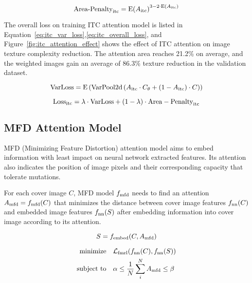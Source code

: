 \figureImageSmoothingComparison%

\begin{equation}
  \text{Area-Penalty}_{\text{itc}} = {\mathrm{E}(A_{\text{itc}})}^{3-2 \cdot \mathrm{E}(A_{\text{itc}})}
  \label{eq:itc_area_penalty}
\end{equation}

\figureItcAttentionEffect%

The overall loss on training ITC attention model is listed in Equation~\ref{eq:itc_var_loss},\ref{eq:itc_overall_loss}, and Figure~\ref{fig:itc_attention_effect} shows the effect of ITC attention on image texture complexity reduction. The attention area reaches 21.2\% on average, and the weighted images gain an average of 86.3\% texture reduction in the validation dataset.

\begin{equation}
  \mathrm{VarLoss} = \mathrm{E} \left( \mathrm{VarPool2d} \left( A_{\text{itc}} \cdot C_{\theta} + (1 - A_{\text{itc}}) \cdot C \right) \right)
  \label{eq:itc_var_loss}
\end{equation}

\begin{equation}
  \mathrm{Loss}_{\text{itc}} = \lambda \cdot \text{VarLoss} + (1 - \lambda) \cdot \mathrm{Area-Penalty}_{\text{itc}}
  \label{eq:itc_overall_loss}
\end{equation}

\subsection{MFD Attention Model}%
\label{ssec:mfd_model}

MFD (Minimizing Feature Distortion) attention model aims to embed information with least impact on neural network extracted features. Its attention also indicates the position of image pixels and their corresponding capacity that tolerate mutations.

For each cover image \(C\), MFD model \(f_{\text{mfd}}\) needs to find an attention \(A_{\text{mfd}} = f_{\text{mfd}}(C)\) that minimizes the distance between cover image features \(f_{\text{nn}}(C)\) and embedded image features \(f_{\text{nn}}(S)\) after embedding information into cover image according to its attention.

\begin{equation}
  S = f_{\text{embed}}(C, A_{\text{mfd}})
\end{equation}

\begin{align}
  \text{minimize}   \quad & \mathcal{L}_\mathrm{fmrl}(f_{\text{nn}}(C), f_{\text{nn}}(S)) \\
  \text{subject to} \quad & \alpha \leq \frac{1}{N} \sum_{i}^{N} A_{\text{mfd}} \leq \beta
\end{align}

